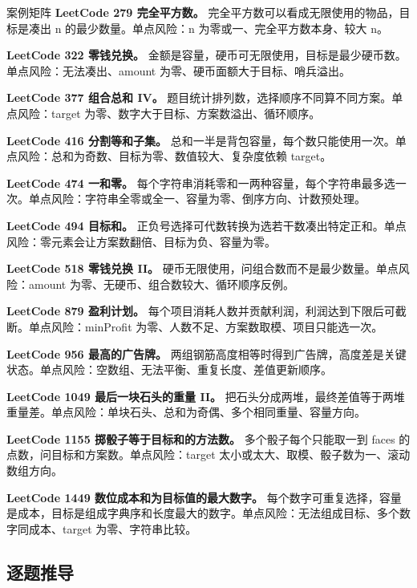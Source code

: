 \begin{principlebox}{案例矩阵}
\textbf{LeetCode 279 完全平方数。}
完全平方数可以看成无限使用的物品，目标是凑出 n 的最少数量。单点风险：n 为零或一、完全平方数本身、较大 n。

\textbf{LeetCode 322 零钱兑换。}
金额是容量，硬币可无限使用，目标是最少硬币数。单点风险：无法凑出、amount 为零、硬币面额大于目标、哨兵溢出。

\textbf{LeetCode 377 组合总和 IV。}
题目统计排列数，选择顺序不同算不同方案。单点风险：target 为零、数字大于目标、方案数溢出、循环顺序。

\textbf{LeetCode 416 分割等和子集。}
总和一半是背包容量，每个数只能使用一次。单点风险：总和为奇数、目标为零、数值较大、复杂度依赖 target。

\textbf{LeetCode 474 一和零。}
每个字符串消耗零和一两种容量，每个字符串最多选一次。单点风险：字符串全零或全一、容量为零、倒序方向、计数预处理。

\textbf{LeetCode 494 目标和。}
正负号选择可代数转换为选若干数凑出特定正和。单点风险：零元素会让方案数翻倍、目标为负、容量为零。

\textbf{LeetCode 518 零钱兑换 II。}
硬币无限使用，问组合数而不是最少数量。单点风险：amount 为零、无硬币、组合数较大、循环顺序反例。

\textbf{LeetCode 879 盈利计划。}
每个项目消耗人数并贡献利润，利润达到下限后可截断。单点风险：minProfit 为零、人数不足、方案数取模、项目只能选一次。

\textbf{LeetCode 956 最高的广告牌。}
两组钢筋高度相等时得到广告牌，高度差是关键状态。单点风险：空数组、无法平衡、重复长度、差值更新顺序。

\textbf{LeetCode 1049 最后一块石头的重量 II。}
把石头分成两堆，最终差值等于两堆重量差。单点风险：单块石头、总和为奇偶、多个相同重量、容量方向。

\textbf{LeetCode 1155 掷骰子等于目标和的方法数。}
多个骰子每个只能取一到 faces 的点数，问目标和方案数。单点风险：target 太小或太大、取模、骰子数为一、滚动数组方向。

\textbf{LeetCode 1449 数位成本和为目标值的最大数字。}
每个数字可重复选择，容量是成本，目标是组成字典序和长度最大的数字。单点风险：无法组成目标、多个数字同成本、target 为零、字符串比较。

\end{principlebox}

\subsection{逐题推导}

